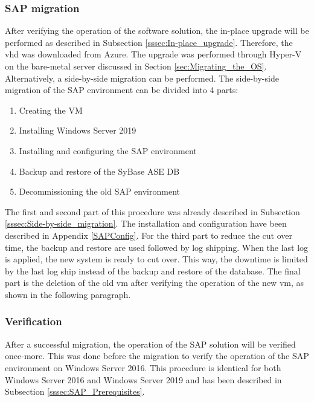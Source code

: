 \subsubsection{SAP migration}
After verifying the operation of the software solution, the in-place upgrade will be performed as described in Subsection \ref{sssec:In-place_upgrade}. 
Therefore, the \acrfull{vhd} was downloaded from Azure.
The upgrade was performed through Hyper-V on the bare-metal server discussed in Section \ref{sec:Migrating_the_OS}.
Alternatively, a side-by-side migration can be performed. 
The side-by-side migration of the SAP environment can be divided into 4 parts:
\begin{enumerate}
    \item Creating the VM
    \item Installing Windows Server 2019
    \item Installing and configuring the SAP environment
    \item Backup and restore of the SyBase ASE DB
    \item Decommissioning the old SAP environment
\end{enumerate}
The first and second part of this procedure was already described in Subsection \ref{sssec:Side-by-side_migration}.
The installation and configuration have been described in Appendix \ref{SAPConfig}. 
For the third part to reduce the cut over time, the backup and restore are used followed by log shipping. 
When the last log is applied, the new system is ready to cut over. 
This way, the downtime is limited by the last log ship instead of the backup and restore of the database. 
The final part is the deletion of the old \acrshort{vm} after verifying the operation of the new \acrshort{vm}, as shown in the following paragraph.

\subsubsection{Verification}
After a successful migration, the operation of the SAP solution will be verified once-more.
This was done before the migration to verify the operation of the SAP environment on Windows Server 2016. 
This procedure is identical for both Windows Server 2016 and Windows Server 2019 and has been described in Subsection \ref{sssec:SAP_Prerequisites}.

